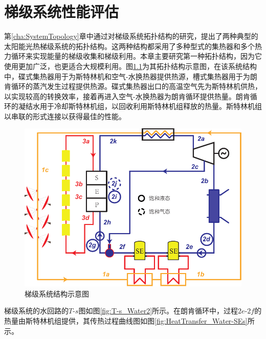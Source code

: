 \chapter{梯级系统性能评估}

第\ref{cha:SystemTopology}章中通过对梯级系统拓扑结构的研究，提出了两种典型的太阳能光热梯级系统的拓扑结构。这两种结构都采用了多种型式的集热器和多个热力循环来实现能量的梯级收集和梯级利用。本章主要研究第一种拓扑结构，因为它使用更加广泛，也更适合大规模利用。图\ref{fig:System-1}为其拓扑结构示意图，在该系统结构中，碟式集热器用于为斯特林机和空气-水换热器提供热源，槽式集热器用于为朗肯循环的蒸汽发生过程提供热源。碟式集热器出口的高温空气先为斯特林机供热，以实现较高的转换效率，接着再进入空气-水换热器为朗肯循环提供热量。朗肯循环的凝结水用于冷却斯特林机组，以回收利用斯特林机组释放的热量。斯特林机组以串联的形式连接以获得最佳的性能。

\begin{figure}[htbp]
\centering
	\includegraphics[width = 0.8\columnwidth]{fig/cascadeSystem}
	\caption{梯级系统结构示意图}
	\label{fig:System-1}
\end{figure}

梯级系统的水回路的$T$-$s$图如图\ref{fig:T-s_Water2}所示。在朗肯循环中，过程$2e$-$2f$的热量由斯特林机组提供，其传热过程曲线图如图\ref{fig:HeatTransfer_Water-SEs}所示。

